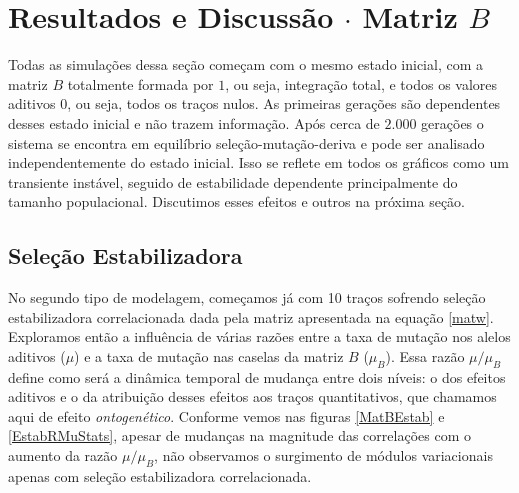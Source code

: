 \section{Resultados e Discussão $\cdot$ Matriz $B$}

Todas as simulações dessa seção começam com o mesmo estado inicial, com
a matriz $B$ totalmente formada por $1$, ou seja, integração total, e
todos os valores aditivos $0$, ou seja, todos os traços nulos. 
As primeiras gerações são dependentes desses estado inicial e não trazem
informação. 
Após cerca de $2.000$ gerações o sistema se encontra em equilíbrio
seleção-mutação-deriva e pode ser analisado independentemente do estado
inicial. 
Isso se reflete em todos os gráficos como um transiente instável, seguido
de estabilidade dependente principalmente do tamanho populacional.
Discutimos esses efeitos e outros na próxima seção. 

\subsection{Seleção Estabilizadora}

No segundo tipo de modelagem, começamos já com 10 traços sofrendo
seleção estabilizadora correlacionada dada pela matriz apresentada na
equação \ref{matw}. 
Exploramos então a influência de várias razões entre a taxa de mutação
nos alelos aditivos ($\mu$) e a taxa de mutação nas caselas da matriz
$B$ ($\mu_B$). 
Essa razão $\mu/\mu_B$ define como será a dinâmica temporal de mudança
entre dois níveis: o dos efeitos aditivos e o da atribuição desses
efeitos aos traços quantitativos, que chamamos aqui de efeito {\it ontogenético}. 
Conforme vemos nas figuras \ref{MatBEstab} e \ref{EstabRMuStats}, apesar de mudanças na
magnitude das correlações com o aumento da razão $\mu/\mu_B$, não
observamos o surgimento de módulos variacionais apenas com seleção
estabilizadora correlacionada. 



